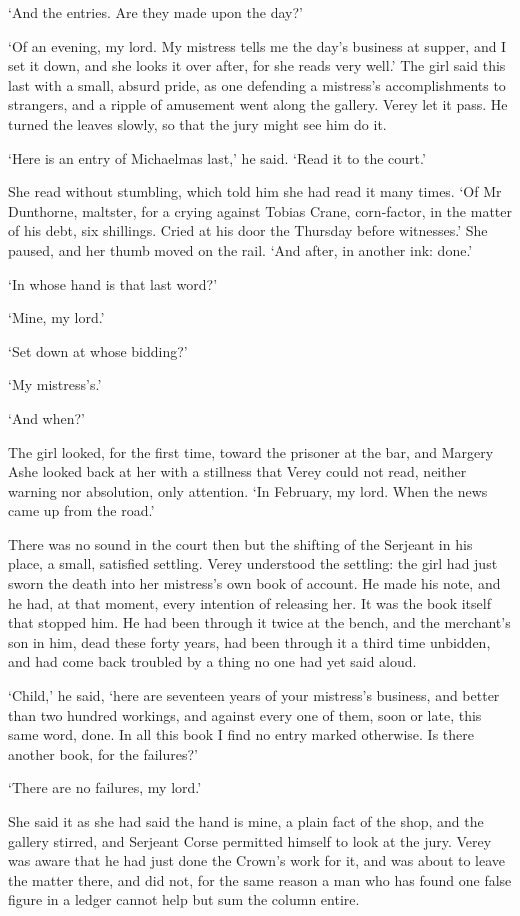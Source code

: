 \documentclass[11pt]{article}
\begin{document}
`And the entries. Are they made upon the day?'

`Of an evening, my lord. My mistress tells me the day's business at supper, and I set it down, and she looks it over after, for she reads very well.' The girl said this last with a small, absurd pride, as one defending a mistress's accomplishments to strangers, and a ripple of amusement went along the gallery. Verey let it pass. He turned the leaves slowly, so that the jury might see him do it.

`Here is an entry of Michaelmas last,' he said. `Read it to the court.'

She read without stumbling, which told him she had read it many times. `Of Mr Dunthorne, maltster, for a crying against Tobias Crane, corn-factor, in the matter of his debt, six shillings. Cried at his door the Thursday before witnesses.' She paused, and her thumb moved on the rail. `And after, in another ink: done.'

`In whose hand is that last word?'

`Mine, my lord.'

`Set down at whose bidding?'

`My mistress's.'

`And when?'

The girl looked, for the first time, toward the prisoner at the bar, and Margery Ashe looked back at her with a stillness that Verey could not read, neither warning nor absolution, only attention. `In February, my lord. When the news came up from the road.'

There was no sound in the court then but the shifting of the Serjeant in his place, a small, satisfied settling. Verey understood the settling: the girl had just sworn the death into her mistress's own book of account. He made his note, and he had, at that moment, every intention of releasing her. It was the book itself that stopped him. He had been through it twice at the bench, and the merchant's son in him, dead these forty years, had been through it a third time unbidden, and had come back troubled by a thing no one had yet said aloud.

`Child,' he said, `here are seventeen years of your mistress's business, and better than two hundred workings, and against every one of them, soon or late, this same word, done. In all this book I find no entry marked otherwise. Is there another book, for the failures?'

`There are no failures, my lord.'

She said it as she had said the hand is mine, a plain fact of the shop, and the gallery stirred, and Serjeant Corse permitted himself to look at the jury. Verey was aware that he had just done the Crown's work for it, and was about to leave the matter there, and did not, for the same reason a man who has found one false figure in a ledger cannot help but sum the column entire.
\end{document}
